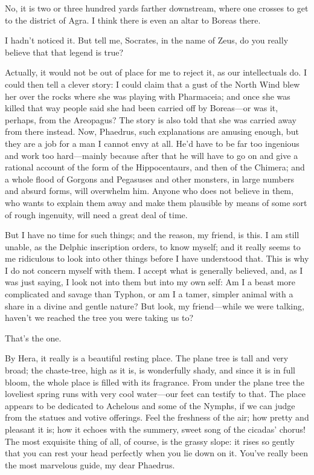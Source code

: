 \saysocrates No, it is two or three hundred yards farther downstream, 
where one crosses to get to the district of Agra. I think there
is even an altar to Boreas there.

\sayphaedrus I hadn’t noticed it. But tell me, Socrates, in the name of
Zeus, do you really believe that that legend is true?

\saysocrates Actually, it would not be out of place for me to reject it, as
our intellectuals do. I could then tell a clever story: I could claim
that a gust of the North Wind blew her over the rocks where she was
playing with Pharmaceia; and once she was killed that way people said
she had been carried off by Boreas---or was it, perhaps, from the
Areopagus? The story is also told that she was carried away from
there instead. Now, Phaedrus, such explanations are amusing enough, but
they are a job for a man I cannot envy at all. He’d have to be far too
ingenious and work too hard---mainly because after that he will have to
go on and give a rational account of the form of the Hippocentaurs, and
then of the Chimera; and a whole flood of Gorgons and Pegasuses
and other monsters, in large numbers and absurd forms, will overwhelm
him. Anyone who does not believe in them, who wants to explain them away
and make them plausible by means of some sort of rough ingenuity, will
need a great deal of time.

But I have no time for such things; and the reason, my friend, is this.
I am still unable, as the Delphic inscription orders, to
know myself; and it really seems to me ridiculous to look into other
things before I have understood that. This is why I do not concern
myself with them. I accept what is generally believed, and, as I was
just saying, I look not into them but into my own self: Am I a beast
more complicated and savage than Typhon, or am I a tamer, simpler animal with a share in a 
divine and gentle nature? But look, my 
friend---while we were talking, haven’t we reached the tree you were
taking us to?

\sayphaedrus That’s the one.

\saysocrates By Hera, it really is a beautiful resting place. The plane
tree is tall and very broad; the chaste-tree, high as it is, is
wonderfully shady, and since it is in full bloom, the whole place is
filled with its fragrance. From under the plane tree the loveliest
spring runs with very cool water---our feet can testify to that. The
place appears to be dedicated to Achelous and some of the Nymphs, if we
can judge from the statues and votive 
offerings. Feel the
freshness of the air; how pretty and pleasant it is; how it echoes with
the summery, sweet song of the cicadas’ chorus! The most exquisite thing
of all, of course, is the grassy slope: it rises so gently that you can
rest your head perfectly when you lie down on it. You’ve really been the
most marvelous guide, my dear Phaedrus.

